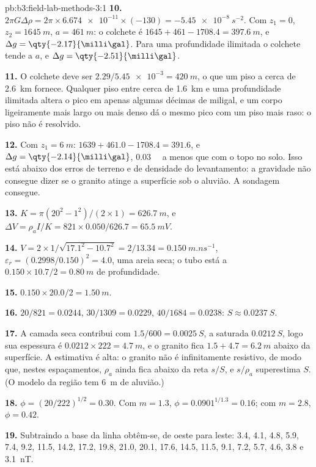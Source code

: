 \begin{solution}{pb:b3:field-lab-methods-3:1}
\textbf{10.} $2\pi G\Delta\rho = 2\pi\times\num{6.674e-11}\times(-130) =
\qty{-5.45e-8}{s^{-2}}$. Com $z_1 = 0$, $z_2 = \qty{1645}{m}$, $a =
\qty{461}{m}$: o colchete é $1645 + 461 - 1708.4 = \qty{397.6}{m}$,
e $\Delta g = \qty{-2.17}{\milli\gal}$. Para uma profundidade ilimitada o
colchete tende a $a$, e $\Delta g = \qty{-2.51}{\milli\gal}$.

\textbf{11.} O colchete deve ser $2.29/\num{5.45e-3} = \qty{420}{m}$, o que um
piso a cerca de \qty{2.6}{km} fornece. Qualquer piso entre cerca de
\qty{1.6}{km} e uma profundidade ilimitada altera o pico em apenas algumas
décimas de miligal, e um corpo ligeiramente mais largo ou mais denso dá o mesmo
pico com um piso mais raso: o piso não é resolvido.

\textbf{12.} Com $z_1 = \qty{6}{m}$: $1639 + 461.0 - 1708.4 = 391.6$, e
$\Delta g = \qty{-2.14}{\milli\gal}$, \qty{0.03}{\milli\gal} a menos que
com o topo no solo. Isso está abaixo dos erros de terreno e de densidade
do levantamento: a gravidade não consegue dizer se o granito atinge
a superfície sob o aluvião. A sondagem consegue.

\textbf{13.} $K = \pi(20^2 - 1^2)/(2\times1) = \qty{626.7}{m}$, e $\Delta V =
\rho_a I/K = 821\times0.050/626.7 = \qty{65.5}{mV}$.

\textbf{14.} $V = 2\times1/\sqrt{17.1^2 - 10.7^2} = 2/13.34 =
\qty{0.150}{m.ns^{-1}}$, $\varepsilon_r = (0.2998/0.150)^2 = 4.0$, uma
areia seca; o tubo está a $0.150\times10.7/2 = \qty{0.80}{m}$ de profundidade.

\textbf{15.} $0.150\times20.0/2 = \qty{1.50}{m}$.

\textbf{16.} $20/821 = \num{0.0244}$, $30/1309 = \num{0.0229}$, $40/1684 =
\num{0.0238}$: $S \approx \qty{0.0237}{S}$.

\textbf{17.} A camada seca contribui com $1.5/600 = \qty{0.0025}{S}$, a
saturada $\qty{0.0212}{S}$, logo sua espessura é $0.0212\times222 =
\qty{4.7}{m}$, e o granito fica $1.5 + 4.7 = \qty{6.2}{m}$ abaixo
da superfície. A estimativa é alta: o granito não é infinitamente
resistivo, de modo que, nestes espaçamentos, $\rho_a$ ainda fica abaixo da reta
$s/S$, e $s/\rho_a$ superestima $S$. (O modelo da região tem
\qty{6}{m} de aluvião.)

\textbf{18.} $\phi = (20/222)^{1/2} = \num{0.30}$. Com $m = 1.3$, $\phi =
0.0901^{1/1.3} = \num{0.16}$; com $m = 2.8$, $\phi = \num{0.42}$.

\textbf{19.} Subtraindo a base da linha obtêm-se, de oeste para leste:
3.4, 4.1, 4.8, 5.9, 7.4, 9.2, 11.5, 14.2, 17.2, 19.8, 21.0, 20.1, 17.6,
14.5, 11.5, 9.1, 7.2, 5.7, 4.6, 3.8 e \qty{3.1}{nT}.


\end{solution}
